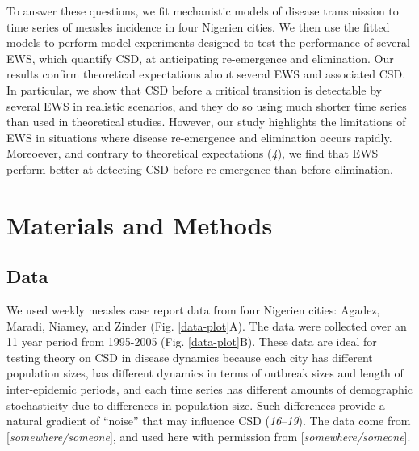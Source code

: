\documentclass[3p]{elsarticle} %
\begin{document}
To answer these questions, we fit mechanistic models of disease
transmission to time series of measles incidence in four Nigerien
cities. We then use the fitted models to perform model experiments
designed to test the performance of several EWS, which quantify CSD, at
anticipating re-emergence and elimination. Our results confirm
theoretical expectations about several EWS and associated CSD. In
particular, we show that CSD before a critical transition is detectable
by several EWS in realistic scenarios, and they do so using much shorter
time series than used in theoretical studies. However, our study
highlights the limitations of EWS in situations where disease
re-emergence and elimination occurs rapidly. Moreoever, and contrary to
theoretical expectations (\emph{4}), we find that EWS perform better at
detecting CSD before re-emergence than before elimination.

\hypertarget{materials-and-methods}{%
\section{Materials and Methods}\label{materials-and-methods}}

\hypertarget{data}{%
\subsection{Data}\label{data}}

We used weekly measles case report data from four Nigerien cities:
Agadez, Maradi, Niamey, and Zinder (Fig. \ref{data-plot}A). The data
were collected over an 11 year period from 1995-2005 (Fig.
\ref{data-plot}B). These data are ideal for testing theory on CSD in
disease dynamics because each city has different population sizes, has
different dynamics in terms of outbreak sizes and length of
inter-epidemic periods, and each time series has different amounts of
demographic stochasticity due to differences in population size. Such
differences provide a natural gradient of ``noise'' that may influence
CSD (\emph{16}--\emph{19}). The data come from
{[}\emph{somewhere/someone}{]}, and used here with permission from
{[}\emph{somewhere/someone}{]}.
\end{document}
